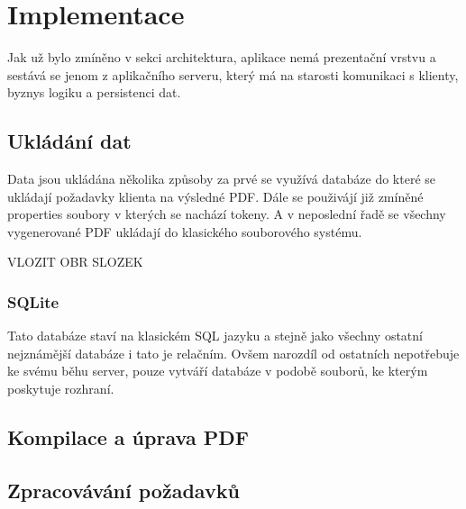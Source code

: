 \chapter{Implementace}
Jak už bylo zmíněno v sekci architektura, aplikace nemá prezentační vrstvu a sestává se jenom z aplikačního serveru, který má na starosti komunikaci s klienty, byznys logiku a persistenci dat.

\section{Ukládání dat}
Data jsou ukládána několika způsoby za prvé se využívá databáze do které se ukládají požadavky klienta na výsledné PDF. Dále se použivájí již zmíněné properties soubory v kterých se nachází tokeny. A v neposlední řadě se všechny vygenerované PDF ukládají do klasického souborového systému. 

VLOZIT OBR SLOZEK

\subsection{SQLite} 
Tato databáze staví na klasickém SQL jazyku a stejně jako všechny ostatní nejznámější databáze i tato je relačním. Ovšem narozdíl od ostatních nepotřebuje ke svému běhu server, pouze vytváří databáze v podobě souborů, ke kterým poskytuje rozhraní.


\section{Kompilace a úprava PDF}

\section{Zpracovávání požadavků}